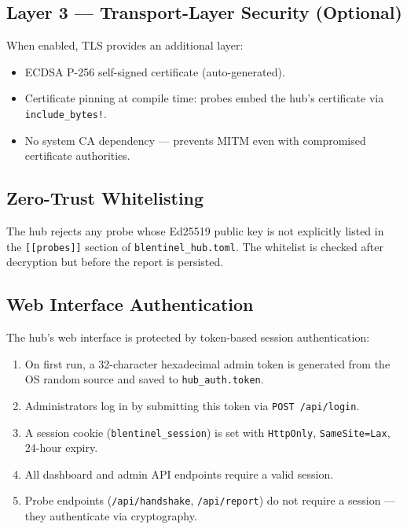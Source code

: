 \documentclass[12pt]{report}
\begin{document}
\subsection{Layer 3 --- Transport-Layer Security (Optional)}

When enabled, TLS provides an additional layer:

\begin{itemize}
    \item ECDSA P-256 self-signed certificate (auto-generated).
    \item Certificate pinning at compile time: probes embed the hub's
          certificate via \texttt{include\_bytes!}.
    \item No system CA dependency --- prevents MITM even with compromised
          certificate authorities.
\end{itemize}

\subsection{Zero-Trust Whitelisting}

The hub rejects any probe whose Ed25519 public key is not explicitly listed in
the \texttt{[[probes]]} section of \texttt{blentinel\_hub.toml}. The whitelist
is checked after decryption but before the report is persisted.

\subsection{Web Interface Authentication}

The hub's web interface is protected by token-based session authentication:

\begin{enumerate}
    \item On first run, a 32-character hexadecimal admin token is generated
          from the OS random source and saved to \texttt{hub\_auth.token}.
    \item Administrators log in by submitting this token via
          \texttt{POST /api/login}.
    \item A session cookie (\texttt{blentinel\_session}) is set with
          \texttt{HttpOnly}, \texttt{SameSite=Lax}, 24-hour expiry.
    \item All dashboard and admin API endpoints require a valid session.
    \item Probe endpoints (\texttt{/api/handshake}, \texttt{/api/report}) do
          not require a session --- they authenticate via cryptography.
\end{enumerate}
\end{document}
